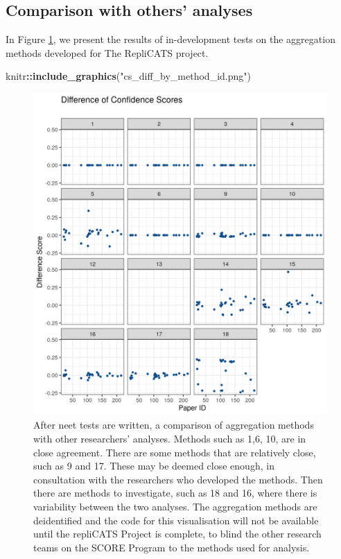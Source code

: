 \documentclass[
]{article}
\newenvironment{Shaded}{\begin{snugshade}}{\end{snugshade}}
\newcommand{\KeywordTok}[1]{\textcolor[rgb]{0.13,0.29,0.53}{\textbf{#1}}}
\newcommand{\NormalTok}[1]{#1}
\newcommand{\OperatorTok}[1]{\textcolor[rgb]{0.81,0.36,0.00}{\textbf{#1}}}
\newcommand{\StringTok}[1]{\textcolor[rgb]{0.31,0.60,0.02}{#1}}
\begin{document}
\hypertarget{comparison-with-others-analyses}{%
\subsection{Comparison with others' analyses}\label{comparison-with-others-analyses}}

In Figure \ref{fig:aggregators}, we present the results of in-development tests on the aggregation methods developed for The RepliCATS project.

\begin{Shaded}
\begin{Highlighting}[]
\NormalTok{knitr}\OperatorTok{::}\KeywordTok{include\_graphics}\NormalTok{(}\StringTok{"cs\_diff\_by\_method\_id.png"}\NormalTok{)}
\end{Highlighting}
\end{Shaded}

\begin{figure}

{\centering \includegraphics[width=26.68in]{cs_diff_by_method_id} 

}

\caption{\label{aggregators} After neet tests are written, a comparison of aggregation methods with other researchers' analyses. Methods such as 1,6, 10, are in close agreement. There are some methods that are relatively close, such as 9 and 17. These may be deemed close enough, in consultation with the researchers who developed the methods. Then there are methods to investigate, such as 18 and 16, where there is variability between the two analyses. The aggregation methods are deidentified and the code for this visualisation will not be available until the repliCATS Project is complete, to blind the other research teams on the SCORE Program to the methods used for analysis.}\label{fig:aggregators}
\end{figure}
\end{document}
